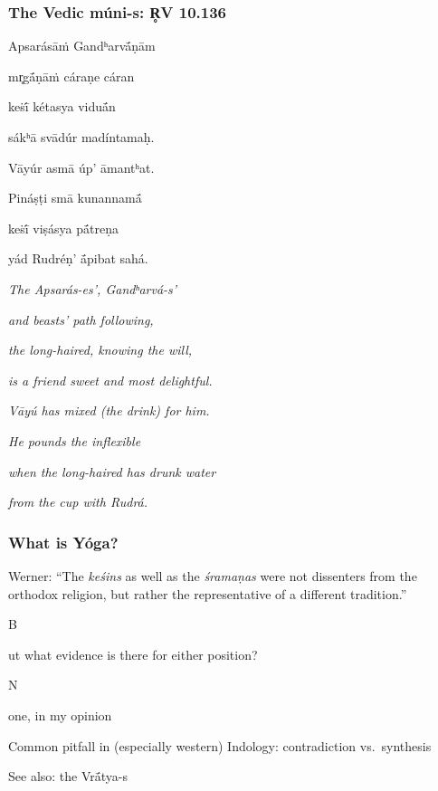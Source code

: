 \documentclass[pdf]{beamer}
\newcommand{\Subitem}[1]{{\setlength\itemindent{12pt} \item[-] #1}}
\begin{document}
\begin{frame} \frametitle{The Vedic múni-s: R̥V 10.136}
\begin{center}
\begin{multicols}{2}
\scriptsize{
	Apsarásāṁ Gandʰarvā́ṇām

	mr̥gā́ṇāṁ cáraṇe cáran

	keṡī́ kétasya viduā́n

	sákʰā svādúr madíntamaḥ.

	\vspace{\baselineskip}

	Vāyúr asmā úp’ āmantʰat.

	Pináṣṭi smā kunannamā́

	keṡī́ viṣásya pā́treṇa

	yád Rudréṇ’ ā́pibat sahá.
	
	\columnbreak

	\textit{The Apsarás-es', Gandʰarvá-s'}

	\textit{and beasts' path following,}

	\textit{the long-haired, knowing the will,}

	\textit{is a friend sweet and most delightful.}

	\vspace{\baselineskip}

	\textit{Vāyú has mixed (the drink) for him.}

	\textit{He pounds the inflexible}

	\textit{when the long-haired has drunk water}

	\textit{from the cup with Rudrá.}

}
\end{multicols}
\end{center}
\end{frame}

\begin{frame} \frametitle{What is Yóga?}
\begin{itemize}
	\item Werner: ``The \emph{keśins} as well as the \emph{śramaṇas} were not dissenters from the orthodox religion, but rather the representative of a different tradition.''
	\Subitem But what evidence is there for either position?
	\Subitem None, in my opinion
	\item Common pitfall in (especially western) Indology: contradiction vs.~synthesis
	\item See also: the Vrā́tya-s
\end{itemize}
\end{frame}
\end{document}
